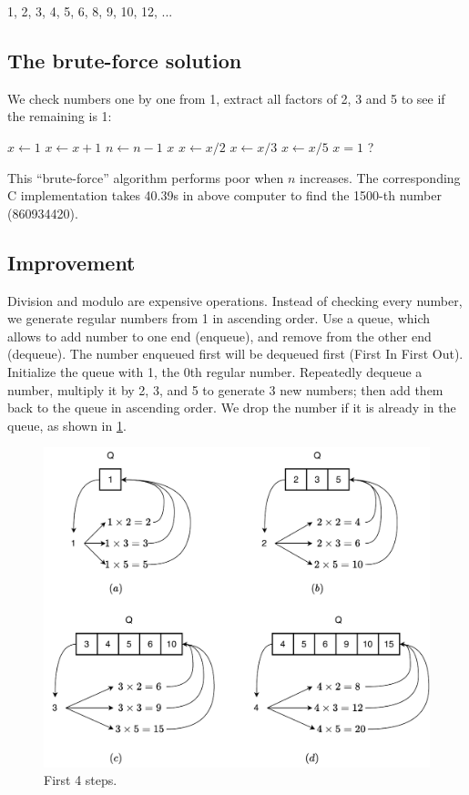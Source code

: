 \documentclass[b5paper]{article}
\begin{document}
1, 2, 3, 4, 5, 6, 8, 9, 10, 12, ...

\subsection*{The brute-force solution}
We check numbers one by one from 1, extract all factors of 2, 3 and 5 to see if the remaining is 1:

\begin{algorithmic}[1]
  \State $x \gets 1$
    \State $x \gets x + 1$
      \State $n \gets n - 1$
    \EndIf
  \EndWhile
  \State \Return $x$
\EndFunction
\Statex
{}
    \State $x \gets x / 2$
  \EndWhile
    \State $x \gets x / 3$
  \EndWhile
    \State $x \gets x / 5$
  \EndWhile
  \State \Return $x = 1$ ?
\EndFunction
\end{algorithmic}

This \enquote{brute-force} algorithm performs poor when $n$ increases. The corresponding C implementation takes 40.39s in above computer to find the 1500-th number (860934420).

\subsection*{Improvement}
Division and modulo are expensive operations\cite{Bentley}. Instead of checking every number, we generate regular numbers from 1 in ascending order. Use a queue, which allows to add number to one end (enqueue), and remove from the other end (dequeue). The number enqueued first will be dequeued first (First In First Out). Initialize the queue with 1, the 0th regular number. Repeatedly dequeue a number, multiply it by 2, 3, and 5 to generate 3 new numbers; then add them back to the queue in ascending order. We drop the number if it is already in the queue, as shown in \cref{fig:queues}.

\begin{figure}[htbp]
  \centering
  \includegraphics[scale=0.5]{img/regular-num-1q}
  \caption{First 4 steps.}
  \label{fig:queues}
\end{figure}
\end{document}
